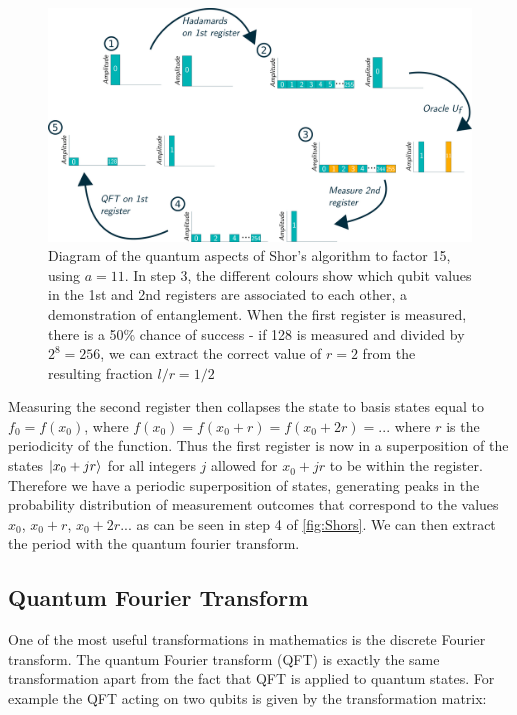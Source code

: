 \begin{figure}
    \centering
    \includegraphics[width=\linewidth]{figures/Shors.png}
    \caption{Diagram of the quantum aspects of Shor's algorithm to factor 15, using $a=11$. In step 3, the different colours show which qubit values in the 1st and 2nd registers are associated to each other, a demonstration of entanglement. When the first register is measured, there is a 50\% chance of success - if 128 is measured and divided by $2^8=256$, we can extract the correct value of $r=2$ from the resulting fraction $l/r = 1/2$}
    \label{fig:Shors}
\end{figure}

Measuring the second register then collapses the state to basis states equal to $f_0 = f(x_0)$, where $f(x_0) = f(x_0 + r) = f(x_0 + 2r) = ...$ where $r$ is the periodicity of the function. Thus the first register is now in a superposition of the states $\left\vert{x_0+jr}\right\rangle$ for all integers $j$ allowed for $x_0+jr$ to be within the register. Therefore we have a periodic superposition of states, generating peaks in the probability distribution of measurement outcomes that correspond to the values $x_0$, $x_0+r$, $x_0+2r$... as can be seen in step 4 of \autoref{fig:Shors}. We can then extract the period with the quantum fourier transform.

\subsection{Quantum Fourier Transform}

One of the most useful transformations in mathematics is the discrete Fourier transform. The quantum Fourier transform (QFT) is exactly the same transformation apart from the fact that QFT is applied to quantum states. For example the QFT acting on two qubits is given by the transformation matrix:

